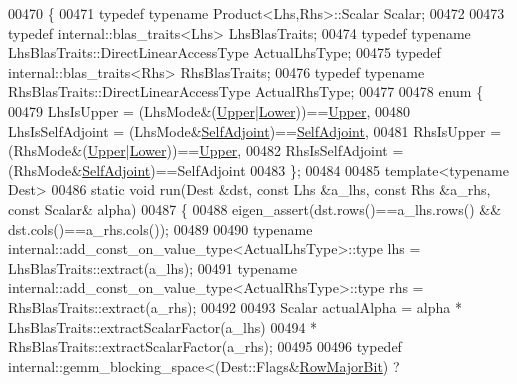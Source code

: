 \begin{DoxyCode}
00470 \{
00471   \textcolor{keyword}{typedef} \textcolor{keyword}{typename} Product<Lhs,Rhs>::Scalar Scalar;
00472   
00473   \textcolor{keyword}{typedef} internal::blas\_traits<Lhs> LhsBlasTraits;
00474   \textcolor{keyword}{typedef} \textcolor{keyword}{typename} LhsBlasTraits::DirectLinearAccessType ActualLhsType;
00475   \textcolor{keyword}{typedef} internal::blas\_traits<Rhs> RhsBlasTraits;
00476   \textcolor{keyword}{typedef} \textcolor{keyword}{typename} RhsBlasTraits::DirectLinearAccessType ActualRhsType;
00477   
00478   \textcolor{keyword}{enum} \{
00479     LhsIsUpper = (LhsMode&(\hyperlink{group__enums_gga39e3366ff5554d731e7dc8bb642f83cda6bcb58be3b8b8ec84859ce0c5ac0aaec}{Upper}|\hyperlink{group__enums_gga39e3366ff5554d731e7dc8bb642f83cda891792b8ed394f7607ab16dd716f60e6}{Lower}))==\hyperlink{group__enums_gga39e3366ff5554d731e7dc8bb642f83cda6bcb58be3b8b8ec84859ce0c5ac0aaec}{Upper},
00480     LhsIsSelfAdjoint = (LhsMode&\hyperlink{group__enums_gga39e3366ff5554d731e7dc8bb642f83cda2491fc6765056421f504eb7e16083e8f}{SelfAdjoint})==\hyperlink{group__enums_gga39e3366ff5554d731e7dc8bb642f83cda2491fc6765056421f504eb7e16083e8f}{SelfAdjoint},
00481     RhsIsUpper = (RhsMode&(\hyperlink{group__enums_gga39e3366ff5554d731e7dc8bb642f83cda6bcb58be3b8b8ec84859ce0c5ac0aaec}{Upper}|\hyperlink{group__enums_gga39e3366ff5554d731e7dc8bb642f83cda891792b8ed394f7607ab16dd716f60e6}{Lower}))==\hyperlink{group__enums_gga39e3366ff5554d731e7dc8bb642f83cda6bcb58be3b8b8ec84859ce0c5ac0aaec}{Upper},
00482     RhsIsSelfAdjoint = (RhsMode&\hyperlink{group__enums_gga39e3366ff5554d731e7dc8bb642f83cda2491fc6765056421f504eb7e16083e8f}{SelfAdjoint})==SelfAdjoint
00483   \};
00484   
00485   \textcolor{keyword}{template}<\textcolor{keyword}{typename} Dest>
00486   \textcolor{keyword}{static} \textcolor{keywordtype}{void} run(Dest &dst, \textcolor{keyword}{const} Lhs &a\_lhs, \textcolor{keyword}{const} Rhs &a\_rhs, \textcolor{keyword}{const} Scalar& alpha)
00487   \{
00488     eigen\_assert(dst.rows()==a\_lhs.rows() && dst.cols()==a\_rhs.cols());
00489 
00490     \textcolor{keyword}{typename} internal::add\_const\_on\_value\_type<ActualLhsType>::type lhs = LhsBlasTraits::extract(a\_lhs);
00491     \textcolor{keyword}{typename} internal::add\_const\_on\_value\_type<ActualRhsType>::type rhs = RhsBlasTraits::extract(a\_rhs);
00492 
00493     Scalar actualAlpha = alpha * LhsBlasTraits::extractScalarFactor(a\_lhs)
00494                                * RhsBlasTraits::extractScalarFactor(a\_rhs);
00495 
00496     \textcolor{keyword}{typedef} internal::gemm\_blocking\_space<(Dest::Flags&\hyperlink{group__flags_gae4f56c2a60bbe4bd2e44c5b19cbe8762}{RowMajorBit}) ? 

\end{DoxyCode}
